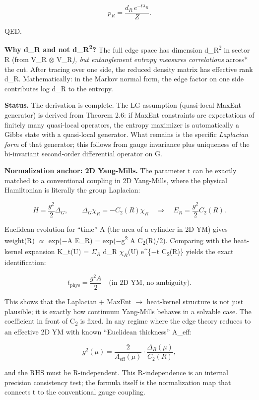 \documentclass[11pt,a4paper]{article}
\theoremstyle{remark}
\begin{document}
\[
p_R = \frac{d_R \, e^{-t \lambda_R}}{Z}.
\]

QED.

\textbf{Why d\_R and not d\_R\textsuperscript{2}?} The full edge space has dimension d\_R\textsuperscript{2} in
sector R (from V\_R \ensuremath{\otimes} V\_R\emph{), but entanglement entropy measures
correlations }across* the cut. After tracing over one side, the reduced density
matrix has effective rank d\_R. Mathematically: in the Markov normal form, the
edge factor on one side contributes log d\_R to the entropy.

\textbf{Status.} The derivation is complete. The LG assumption (quasi-local MaxEnt
generator) is derived from Theorem 2.6: if MaxEnt constraints are expectations
of finitely many quasi-local operators, the entropy maximizer is automatically
a Gibbs state with a quasi-local generator. What remains is the specific
\emph{Laplacian form} of that generator; this follows from gauge invariance plus
uniqueness of the bi-invariant second-order differential operator on G.

\textbf{Normalization anchor: 2D Yang-Mills.} The parameter t can be exactly
matched to a conventional coupling in 2D Yang-Mills, where the physical
Hamiltonian is literally the group Laplacian:

\[
H = \frac{g^2}{2} \Delta_G, \qquad
\Delta_G \chi_R = -C_2(R) \chi_R
\quad \Rightarrow \quad
E_R = \frac{g^2}{2} C_2(R).
\]

Euclidean evolution for ``time'' A (the area of a cylinder in 2D YM) gives
weight(R) \ensuremath{\propto} exp(\ensuremath{-}A E\_R) = exp(\ensuremath{-}g\textsuperscript{2} A C\textsubscript{2}(R)/2). Comparing with the
heat-kernel expansion K\_t(U) = $\Sigma_R$ d\_R $\chi_R$(U) e\^{}\{\ensuremath{-}t C\textsubscript{2}(R)\} yields the
exact identification:

\[
t_\mathrm{phys} = \frac{g^2 A}{2} \quad \text{(in 2D YM, no ambiguity).}
\]

This shows that the Laplacian + MaxEnt \ensuremath{\to} heat-kernel structure is not just
plausible; it is exactly how continuum Yang-Mills behaves in a solvable case.
The coefficient in front of C\textsubscript{2} is fixed. In any regime where the edge theory
reduces to an effective 2D YM with known ``Euclidean thickness'' A\_eff:

\[
g^2(\mu) = \frac{2}{A_\mathrm{eff}(\mu)} \cdot \frac{\Delta_R(\mu)}{C_2(R)},
\]

and the RHS must be R-independent. This R-independence is an internal
precision consistency test; the formula itself is the normalization map that
connects t to the conventional gauge coupling.
\end{document}
